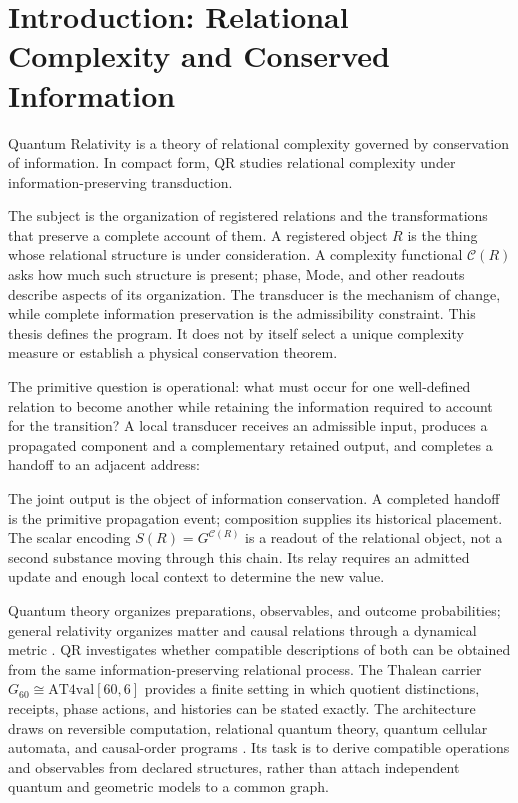 \section{Introduction: Relational Complexity and Conserved Information}\label{sec:introduction}
\begin{principle}[title=Quantum Relativity]
Quantum Relativity is a theory of relational complexity governed by conservation of information. In compact form, QR studies relational complexity under information-preserving transduction.
\end{principle}
The subject is the organization of registered relations and the transformations that preserve a complete account of them. A registered object $R$ is the thing whose relational structure is under consideration. A complexity functional $\mathcal C(R)$ asks how much such structure is present; phase, Mode, and other readouts describe aspects of its organization. The transducer is the mechanism of change, while complete information preservation is the admissibility constraint. This thesis defines the program. It does not by itself select a unique complexity measure or establish a physical conservation theorem.

The primitive question is operational: what must occur for one well-defined relation to become another while retaining the information required to account for the transition? A local transducer receives an admissible input, produces a propagated component and a complementary retained output, and completes a handoff to an adjacent address:

The joint output is the object of information conservation. A completed handoff is the primitive propagation event; composition supplies its historical placement. The scalar encoding $S(R)=G^{\mathcal C(R)}$ is a readout of the relational object, not a second substance moving through this chain. Its relay requires an admitted update and enough local context to determine the new value.

Quantum theory organizes preparations, observables, and outcome probabilities; general relativity organizes matter and causal relations through a dynamical metric \citep{watrous2018,carroll1997}. QR investigates whether compatible descriptions of both can be obtained from the same information-preserving relational process. The Thalean carrier $G_{60}\cong\mathrm{AT4val}[60,6]$ provides a finite setting in which quotient distinctions, receipts, phase actions, and histories can be stated exactly. The architecture draws on reversible computation, relational quantum theory, quantum cellular automata, and causal-order programs \citep{bennett1973,rovelli1996,arrighi2019,sorkin2003}. Its task is to derive compatible operations and observables from declared structures, rather than attach independent quantum and geometric models to a common graph.

